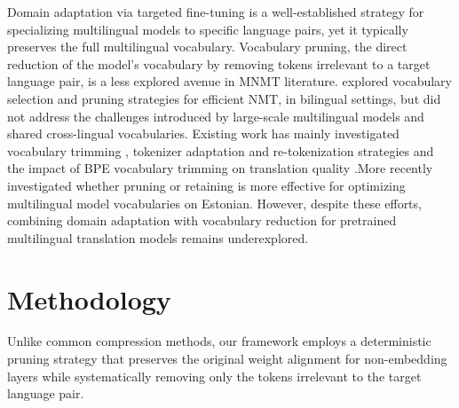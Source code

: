 \documentclass{article}
\begin{document}
	Domain adaptation via targeted fine-tuning is a well-established strategy for specializing
	multilingual models to specific language pairs, yet it typically preserves the full multilingual
	vocabulary. Vocabulary pruning, the direct reduction of the model's vocabulary by
	removing tokens irrelevant to a target language pair, is a less explored avenue in MNMT
	literature. \citep{wang2023vocabulary} explored vocabulary selection and pruning strategies for efficient NMT,  in bilingual settings, but did not address the challenges introduced by large-scale multilingual models and shared cross-lingual vocabularies. Existing work has mainly investigated vocabulary trimming \citep{ushio-etal-2023-efficient},
	tokenizer adaptation and re-tokenization strategies \citep{dorkin2024tokenization} and the impact of
	BPE vocabulary trimming on translation quality \citep{cognetta2024analysis}.More recently \citep{dabkowska2025prune} investigated whether   pruning or retaining is more effective for optimizing multilingual model vocabularies on Estonian. However, despite
	these efforts, combining domain adaptation with vocabulary reduction for pretrained
	multilingual translation models remains underexplored.
	
	\section{Methodology}
	\label{sec:proposed}
	
	Unlike common compression methods, our framework employs a deterministic pruning
	strategy that preserves the original weight alignment for non-embedding layers while
	systematically removing only the tokens irrelevant to the target language pair.
	
\end{document}
